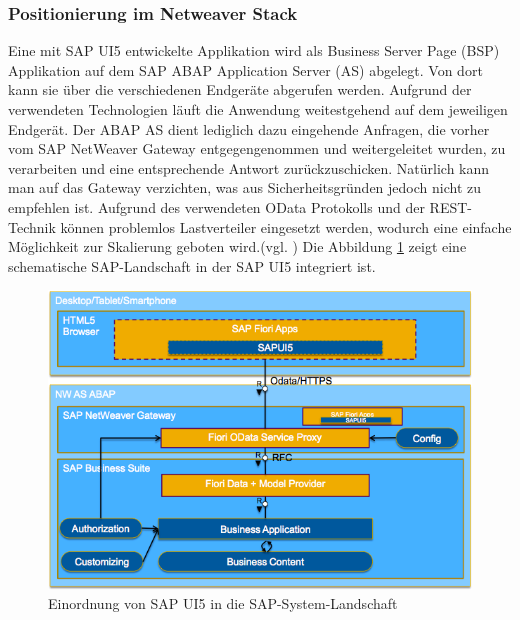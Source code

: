 \subsubsection{Positionierung im Netweaver Stack}
Eine mit SAP UI5 entwickelte Applikation wird als Business Server Page (BSP) Applikation auf dem SAP ABAP Application Server (AS) abgelegt. Von dort kann sie über die verschiedenen Endgeräte abgerufen werden. Aufgrund der verwendeten Technologien läuft die Anwendung weitestgehend auf dem jeweiligen Endgerät. Der ABAP AS dient lediglich dazu eingehende Anfragen, die vorher vom SAP NetWeaver Gateway entgegengenommen und weitergeleitet wurden, zu verarbeiten und eine entsprechende Antwort zurückzuschicken. Natürlich kann man auf das Gateway verzichten, was aus Sicherheitsgründen jedoch nicht zu empfehlen ist. Aufgrund des verwendeten OData Protokolls und der REST-Technik können problemlos Lastverteiler eingesetzt werden, wodurch eine einfache Möglichkeit zur Skalierung geboten wird.(vgl. \cite{SAPFIORIARCH}) Die Abbildung \ref{fig:sapui5arch} zeigt eine schematische SAP-Landschaft in der SAP UI5 integriert ist.

\vspace{1em}
\begin{figure}[htb]
  \centering
  \includegraphics[width=0.8\linewidth]{abb/sap_ui5_architecture}
  \caption[Einordnung von SAP UI5 in die SAP-System-Landschaft]{Einordnung von SAP UI5 in die SAP-System-Landschaft \cite{SAPFIORIARCH}}
  \label{fig:sapui5arch}
\end{figure}